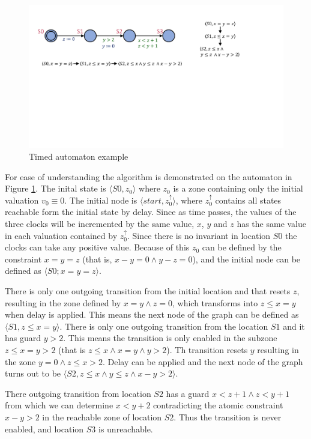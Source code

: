\begin{figure} [h]
	\centering
	\includegraphics[width=.7\textwidth]{include/figures/splitexample_aut}
	\caption{Timed automaton example}
	\label{fig:splitex}
\end{figure}  


\begin{example}
	


For ease of understanding the algorithm is demonstrated on the automaton in Figure \ref{fig:splitex}. The inital state is  $\langle S0, z_0 \rangle$ where $z_0$ is a zone containing only the initial valuation $v_0 \equiv 0$. The initial node is  $\langle start, z_0^\uparrow  \rangle$, where $z_0^\uparrow$ contains all states reachable form the initial state by delay. Since as time passes, the values of the three clocks will be incremented by the same value, $x$, $y$ and $z$ has the same value in each valuation contained by $z_0^\uparrow$. Since there is no invariant in location $S0$ the clocks can take any positive value. Because of this $z_0$ can be defined by the constraint $x=y=z$ (that is, $x-y = 0 \wedge y-z=0 $), and the initial node can be defined as $\langle S0; x=y=z  \rangle$.

There is only one outgoing transition from the initial location and that resets $z$, resulting in the zone defined by $x=y \wedge z=0$, which transforms into $z \leq x=y$ when delay is applied. This means the next node of the graph can be defined as $\langle S1, z \leq x=y \rangle$. There is only one outgoing transition from the location $S1$ and it has guard $y>2$. This means the transition is only enabled in the subzone $z \leq x=y>2$ (that is $z \leq x \wedge x=y \wedge y>2$). Th transition resets $y$ resulting in the zone $y=0 \wedge z \leq x > 2$. Delay can be applied and the next node of the graph turns out to be $\langle S2, z \leq x \wedge y \leq z \wedge x-y>2 \rangle$.

There outgoing transition from location $S2$ has a guard $x<z+1 \wedge z<y+1$ from which we can determine $x<y+2$ contradicting the atomic constraint $x-y>2$ in the reachable zone of location $S2$. Thus the transition is never enabled, and location $S3$ is unreachable.  


\end{example}
